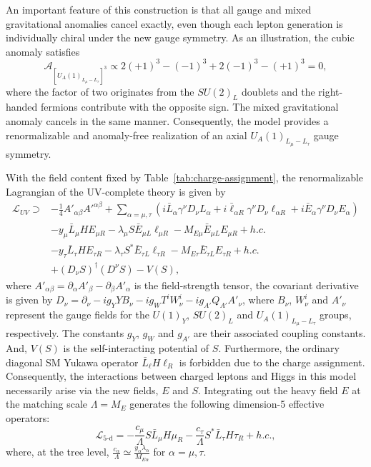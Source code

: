 \documentclass[onecolumn, aps, nofootinbib, prd, preprint, floats, floatfix, amsmath, amssymb, superscriptaddress, preprintnumbers]{revtex4-2}
\begin{document}
An important feature of this construction is that all gauge and mixed gravitational anomalies cancel exactly, even though each lepton generation is individually chiral under the new gauge symmetry. As an illustration, the cubic anomaly satisfies \cite{Ismail:2016tod}
\begin{equation}
\mathcal{A}_{[U_A(1)_{L_\mu-L_\tau}]^3}
\propto
2(+1)^3
-(-1)^3
+2(-1)^3
-(+1)^3
=0,
\end{equation}
where the factor of two originates from the $SU(2)_L$ doublets and the right-handed fermions contribute with the opposite sign. The mixed gravitational anomaly cancels in the same manner. Consequently, the model provides a renormalizable and anomaly-free realization of an axial $U_A(1)_{L_\mu-L_\tau}$ gauge symmetry.



With the field content fixed by Table~\ref{tab:charge-assignment}, the renormalizable Lagrangian of the UV-complete theory is given by
\begin{equation}\label{eq:Lagrangian}
\begin{aligned}
\mathcal{L}_{UV}\supset& -\frac{1}{4}A'_{\alpha\beta}A'^{\alpha\beta}+\sum_{\alpha=\mu,\tau}\left(i\bar{L}_\alpha \gamma^\nu D_{\nu} L_\alpha + i\bar{\ell}_{\alpha R} \gamma^\nu D_{\nu}\ell_{\alpha R} + i\bar{E}_{\alpha}\gamma^\nu D_{\nu} E_{\alpha}\right)  \\
& -y_\mu \bar L_\mu H E_{\mu R} -\lambda_\mu S \bar E_{\mu L}\ell_{\mu R} -M_{E\mu}\bar E_{\mu L}E_{\mu R} + h.c.\\
&-y_\tau \bar L_\tau H E_{\tau R} -\lambda_\tau S^{*}\bar E_{\tau L}\ell_{\tau R} -M_{E\tau}\bar E_{\tau L}E_{\tau R} + h.c.\\
&+ (D_{\nu}S)^\dagger (D^{\nu}S) - V(S),
\end{aligned}
\end{equation}
where $A'_{\alpha\beta}=\partial_\alpha A'_\beta - \partial_\beta A'_\alpha$ is the field-strength tensor, the covariant derivative is given by $D_\nu = \partial_\nu -ig_Y Y B_\nu  -ig_W T^iW_\nu^i - ig_{A'} Q_{A'} A'_\nu$, where $B_\nu$, $W_\nu^i$ and $A'_\nu$ represent the gauge fields for the ${U(1)}_Y$, ${SU(2)}_L$ and ${U_A(1)}_{L_\mu-L_\tau}$ groups, respectively. The constants $g_Y$, $g_W$ and $g_{A'}$ are their associated coupling constants. And, $V(S)$ is the self-interacting potential of $S$. Furthermore, the ordinary diagonal SM Yukawa operator $\bar L_\ell H\ell_R$ is forbidden due to the charge assignment. Consequently, the interactions between charged leptons and Higgs in this model necessarily arise via the new fields, $E$ and $S$. Integrating out the heavy field $E$ at the matching scale $\Lambda=M_E$ generates the following dimension-5 effective operators:
\begin{equation}\label{eq:5-d}
    \mathcal{L}_{\text{5-d}} =
    -\frac{c_\mu}{\Lambda} S \bar{L}_\mu H\mu_R
    -\frac{c_\tau}{\Lambda} S^* \bar{L}_\tau H\tau_R
    +h.c.,
\end{equation}
where, at the tree level, $\frac{c_\alpha}{\Lambda}\simeq \frac{y_\alpha \lambda_\alpha}{M_{E\alpha }}$ for $\alpha=\mu,\tau$.
\end{document}
